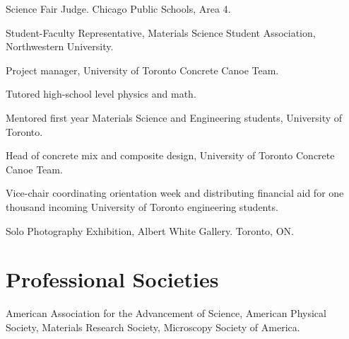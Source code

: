 Science Fair Judge. Chicago Public Schools, Area 4.

Student-Faculty Representative, Materials Science Student Association, Northwestern University.

Project manager, University of Toronto Concrete Canoe Team.

Tutored high-school level physics and math.

Mentored first year Materials Science and Engineering students, University of Toronto.

Head of concrete mix and composite design, University of Toronto Concrete Canoe Team.

Vice-chair coordinating orientation week and distributing financial aid for one thousand incoming University of Toronto engineering students.

Solo Photography Exhibition, Albert White Gallery. Toronto, ON.
\endgroup

\section*{Professional Societies}
American Association for the Advancement of Science, American Physical Society, Materials Research Society, Microscopy Society of America.